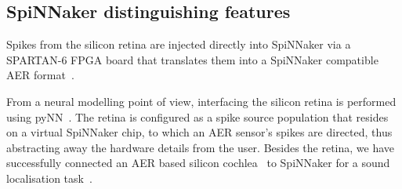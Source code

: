 
\subsection{SpiNNaker distinguishing features}
Spikes from the silicon retina are injected directly into SpiNNaker via a SPARTAN-6 FPGA board that translates them into a SpiNNaker compatible AER format~\cite{appnote8}. 

From a neural modelling point of view, interfacing the silicon retina is performed using pyNN~\cite{davison2008pynn}. 
The retina is configured as a spike source population that resides on a virtual SpiNNaker chip, to which an AER sensor's spikes are directed, thus abstracting away the hardware details from the user\cite{galluppi2012real}.
Besides the retina, we have successfully connected an AER based silicon cochlea~\cite{5537164} to SpiNNaker for a sound localisation task~\cite{6706931}.

